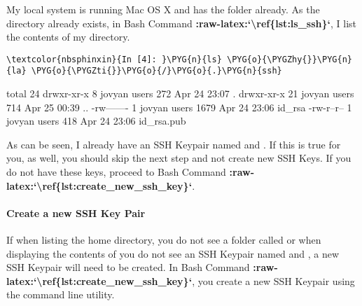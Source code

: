 \documentclass[letterpaper,10pt,english]{sphinxmanual}
\begin{document}
My local system is running Mac OS X and has the  folder already.
As the directory already exists, in Bash Command
{\color{red}\bfseries{}:raw-latex:{}`\textbackslash{}ref\{lst:ls\_ssh\}{}`}, I list the contents of my 
directory.

%
\begin{Verbatim}[commandchars=\\\{\}]
\textcolor{nbsphinxin}{In [4]: }\PYG{n}{ls} \PYG{o}{\PYGZhy{}}\PYG{n}{la} \PYG{o}{\PYGZti{}}\PYG{o}{/}\PYG{o}{.}\PYG{n}{ssh}
\end{Verbatim}



%
\begin{OriginalVerbatim}[commandchars=\\\{\}]
total 24
drwxr-xr-x  8 jovyan users  272 Apr 24 23:07 .
drwxr-xr-x 21 jovyan users  714 Apr 25 00:39 ..
-rw-------  1 jovyan users 1679 Apr 24 23:06 id\_rsa
-rw-r--r--  1 jovyan users  418 Apr 24 23:06 id\_rsa.pub
\end{OriginalVerbatim}
\relax

As can be seen, I already have an SSH Keypair named  and
. If this is true for you, as well, you should skip the
next step and not create new SSH Keys. If you do not have these keys,
proceed to Bash Command {\color{red}\bfseries{}:raw-latex:{}`\textbackslash{}ref\{lst:create\_new\_ssh\_key\}{}`}.


\paragraph{Create a new SSH Key Pair}
\label{\detokenize{01-amazon-web-services:Create-a-new-SSH-Key-Pair}}
If when listing the home directory, you do not see a folder called
 or when displaying the contents of  you do not see an
SSH Keypair named  and , a new SSH Keypair will
need to be created. In Bash Command
{\color{red}\bfseries{}:raw-latex:{}`\textbackslash{}ref\{lst:create\_new\_ssh\_key\}{}`}, you create a new SSH Keypair
using the  command line utility.
\end{document}
